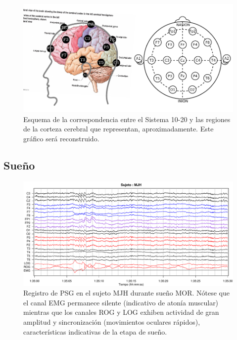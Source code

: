 \begin{figure}
\centering
\includegraphics[width=\linewidth]{./img_diagramas/cerebro_1020.pdf} 
\caption{Esquema de la correspondencia entre el Sistema 10-20 y las regiones de la corteza cerebral 
que representan, aproximadamente. Este gráfico será reconstruido.
}
\label{corresponde_1020}
\end{figure}


\subsection{Sueño}

\begin{figure}
\centering
\includegraphics[width=\linewidth]
{./img_ejemplos/MJH_190_PDG_lucirse_PSG.pdf}
\caption{Registro de PSG en el sujeto MJH durante sue\~no MOR. N\'otese que el canal EMG permanece 
silente (indicativo de aton\'ia muscular) mientras que los canales ROG y LOG exhiben actividad de 
gran amplitud y sincronizaci\'on (movimientos oculares r\'apidos), caracter\'isticas indicativas de
la etapa de sue\~no.}
\label{ejemplos_mor}
\end{figure}

%

